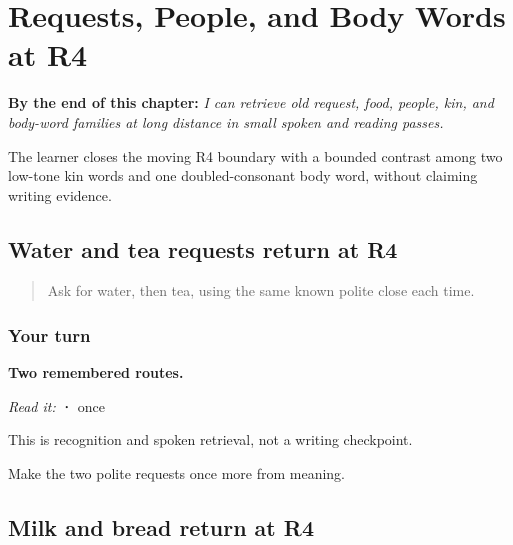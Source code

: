 
\chapter{Requests, People, and Body Words at R4}
\label{ch:pa-request-people-r4-bridge}

\begin{chapteropening}
\textbf{By the end of this chapter:} \emph{I can retrieve old request, food, people, kin, and body-word families at long distance in small spoken and reading passes.}

The learner closes the moving R4 boundary with a bounded contrast among two low-tone kin words and one doubled-consonant body word, without claiming writing evidence.
\end{chapteropening}

\section[Practice]{Water and tea requests return at R4}

\label{lesson:PA-R25-drink-request-r4}



\begin{quote}
Ask for water, then tea, using the same known polite close each time.
\end{quote}

\subsection*{Your turn}
\textbf{Two remembered routes.}

\emph{Read it:} \textbf{ · } once

This is recognition and spoken retrieval, not a writing checkpoint.

\begin{tcolorbox}[breakable,colback=teal!4,colframe=teal!35!black,title={Before you move on}]
Make the two polite requests once more from meaning.
\end{tcolorbox}
\section[Practice]{Milk and bread return at R4}


